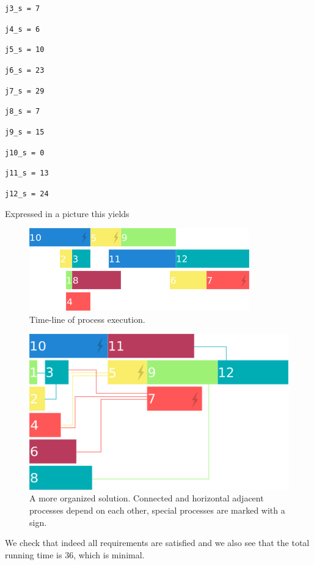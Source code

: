 \documentclass[a4paper]{article}
\begin{document}
{\tt j3\_s = 7 }

{\tt j4\_s = 6 }

{\tt j5\_s = 10 }

{\tt j6\_s = 23 }

{\tt j7\_s = 29 }

{\tt j8\_s = 7 }

{\tt j9\_s = 15 }

{\tt j10\_s = 0 }

{\tt j11\_s = 13 }

{\tt j12\_s = 24 }

Expressed in a picture this yields

\begin{figure}[H]
	\centering
	\includegraphics[scale=1]{timeline-2.png}
	\caption{Time-line of process execution.}
\end{figure}

\begin{figure}[H]
		\centering
			\includegraphics[scale=0.7]{timeline.png}
		\caption{A more organized solution. Connected and horizontal adjacent processes depend on each other, special processes are marked with a sign.}
\end{figure}

We check that indeed all requirements are satisfied and we also see that the total running time is 36, which is minimal.\\
\end{document}
